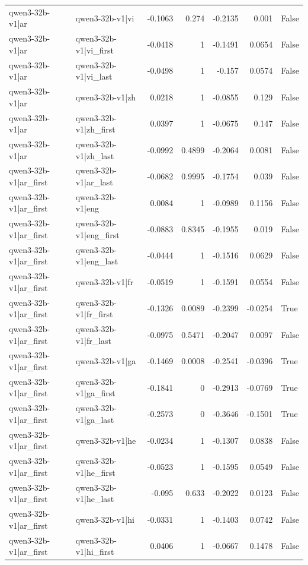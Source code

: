 \begin{table}
\begin{tabular}{l l r r r r l}
qwen3-32b-v1|ar & qwen3-32b-v1|vi & -0.1063 & 0.274 & -0.2135 & 0.001 & False \\
qwen3-32b-v1|ar & qwen3-32b-v1|vi_first & -0.0418 & 1 & -0.1491 & 0.0654 & False \\
qwen3-32b-v1|ar & qwen3-32b-v1|vi_last & -0.0498 & 1 & -0.157 & 0.0574 & False \\
qwen3-32b-v1|ar & qwen3-32b-v1|zh & 0.0218 & 1 & -0.0855 & 0.129 & False \\
qwen3-32b-v1|ar & qwen3-32b-v1|zh_first & 0.0397 & 1 & -0.0675 & 0.147 & False \\
qwen3-32b-v1|ar & qwen3-32b-v1|zh_last & -0.0992 & 0.4899 & -0.2064 & 0.0081 & False \\
qwen3-32b-v1|ar_first & qwen3-32b-v1|ar_last & -0.0682 & 0.9995 & -0.1754 & 0.039 & False \\
qwen3-32b-v1|ar_first & qwen3-32b-v1|eng & 0.0084 & 1 & -0.0989 & 0.1156 & False \\
qwen3-32b-v1|ar_first & qwen3-32b-v1|eng_first & -0.0883 & 0.8345 & -0.1955 & 0.019 & False \\
qwen3-32b-v1|ar_first & qwen3-32b-v1|eng_last & -0.0444 & 1 & -0.1516 & 0.0629 & False \\
qwen3-32b-v1|ar_first & qwen3-32b-v1|fr & -0.0519 & 1 & -0.1591 & 0.0554 & False \\
qwen3-32b-v1|ar_first & qwen3-32b-v1|fr_first & -0.1326 & 0.0089 & -0.2399 & -0.0254 & True \\
qwen3-32b-v1|ar_first & qwen3-32b-v1|fr_last & -0.0975 & 0.5471 & -0.2047 & 0.0097 & False \\
qwen3-32b-v1|ar_first & qwen3-32b-v1|ga & -0.1469 & 0.0008 & -0.2541 & -0.0396 & True \\
qwen3-32b-v1|ar_first & qwen3-32b-v1|ga_first & -0.1841 & 0 & -0.2913 & -0.0769 & True \\
qwen3-32b-v1|ar_first & qwen3-32b-v1|ga_last & -0.2573 & 0 & -0.3646 & -0.1501 & True \\
qwen3-32b-v1|ar_first & qwen3-32b-v1|he & -0.0234 & 1 & -0.1307 & 0.0838 & False \\
qwen3-32b-v1|ar_first & qwen3-32b-v1|he_first & -0.0523 & 1 & -0.1595 & 0.0549 & False \\
qwen3-32b-v1|ar_first & qwen3-32b-v1|he_last & -0.095 & 0.633 & -0.2022 & 0.0123 & False \\
qwen3-32b-v1|ar_first & qwen3-32b-v1|hi & -0.0331 & 1 & -0.1403 & 0.0742 & False \\
qwen3-32b-v1|ar_first & qwen3-32b-v1|hi_first & 0.0406 & 1 & -0.0667 & 0.1478 & False \\

\end{tabular}
\end{table}
